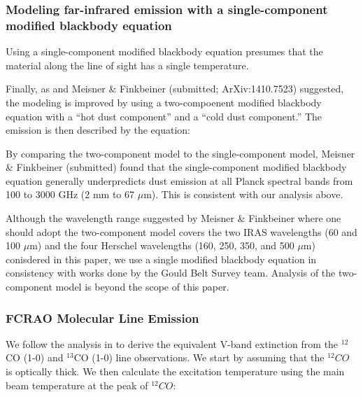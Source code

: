 \documentclass[11pt,a4paper]{emulateapj}
\begin{document}
\subsubsection{Modeling far-infrared emission with a single-component modified blackbody equation}
Using a single-component modified blackbody equation presumes that the material along the line of sight has a single temperature.

Finally, as \citet{Finkbeiner_1999} and Meisner \& Finkbeiner (submitted; ArXiv:1410.7523) suggested, the modeling is improved by using a two-compoenent modified blackbody equation with a ``hot dust component'' and a ``cold dust component.'' The emission is then described by the equation:

By comparing the two-component model to the single-component model, Meisner \& Finkbeiner (submitted) found that the single-component modified blackbody equation generally underpredicts dust emission at all Planck spectral bands from 100 to 3000 GHz (2 mm to 67 $\mu$m). This is consistent with our analysis above.

Although the wavelength range suggested by Meisner \& Finkbeiner where one should adopt the two-component model covers the two IRAS wavelengths (60 and 100 $\mu$m) and the four Herschel wavelengths (160, 250, 350, and 500 $\mu$m) conisdered in this paper, we use a single modified blackbody equation in consistency with works done by the Gould Belt Survey team. Analysis of the two-component model is beyond the scope of this paper.




\subsubsection{FCRAO Molecular Line Emission}
We follow the analysis in \citet{Pineda_2008} to derive the equivalent V-band extinction from the $^{12}$CO (1-0) and $^{13}$CO (1-0) line observations. We start by assuming that the $^{12}CO$ is optically thick. We then calculate the excitation temperature using the main beam temperature at the peak of $^{12}CO$:
\end{document}
